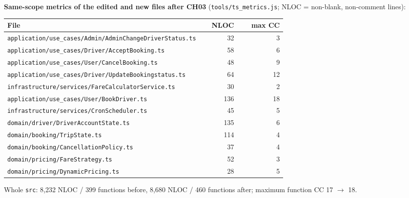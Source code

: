 \documentclass[11pt,a4paper]{article}
\begin{document}
\textbf{Same-scope metrics of the edited and new files after CH03} (\texttt{tools/ts\_metrics.js}; NLOC = non-blank, non-comment lines):
\begin{longtable}{@{}P{0.7\linewidth}rr@{}}\toprule File & NLOC & max CC\\\midrule\endhead
\texttt{application/\allowbreak{}use\_\allowbreak{}cases/\allowbreak{}Admin/\allowbreak{}AdminChangeDriverStatus.\allowbreak{}ts} & 32 & 3 \\
\texttt{application/\allowbreak{}use\_\allowbreak{}cases/\allowbreak{}Driver/\allowbreak{}AcceptBooking.\allowbreak{}ts} & 58 & 6 \\
\texttt{application/\allowbreak{}use\_\allowbreak{}cases/\allowbreak{}User/\allowbreak{}CancelBooking.\allowbreak{}ts} & 48 & 9 \\
\texttt{application/\allowbreak{}use\_\allowbreak{}cases/\allowbreak{}Driver/\allowbreak{}UpdateBookingstatus.\allowbreak{}ts} & 64 & 12 \\
\texttt{infrastructure/\allowbreak{}services/\allowbreak{}FareCalculatorService.\allowbreak{}ts} & 30 & 2 \\
\texttt{application/\allowbreak{}use\_\allowbreak{}cases/\allowbreak{}User/\allowbreak{}BookDriver.\allowbreak{}ts} & 136 & 18 \\
\texttt{infrastructure/\allowbreak{}services/\allowbreak{}CronScheduler.\allowbreak{}ts} & 45 & 5 \\
\texttt{domain/\allowbreak{}driver/\allowbreak{}DriverAccountState.\allowbreak{}ts} & 135 & 6 \\
\texttt{domain/\allowbreak{}booking/\allowbreak{}TripState.\allowbreak{}ts} & 114 & 4 \\
\texttt{domain/\allowbreak{}booking/\allowbreak{}CancellationPolicy.\allowbreak{}ts} & 37 & 4 \\
\texttt{domain/\allowbreak{}pricing/\allowbreak{}FareStrategy.\allowbreak{}ts} & 52 & 3 \\
\texttt{domain/\allowbreak{}pricing/\allowbreak{}DynamicPricing.\allowbreak{}ts} & 28 & 5 \\
\bottomrule\end{longtable}
Whole \texttt{src}: 8{,}232 NLOC / 399 functions before, 8{,}680 NLOC / 460 functions after; maximum function CC 17 $\rightarrow$ 18.
\end{document}

